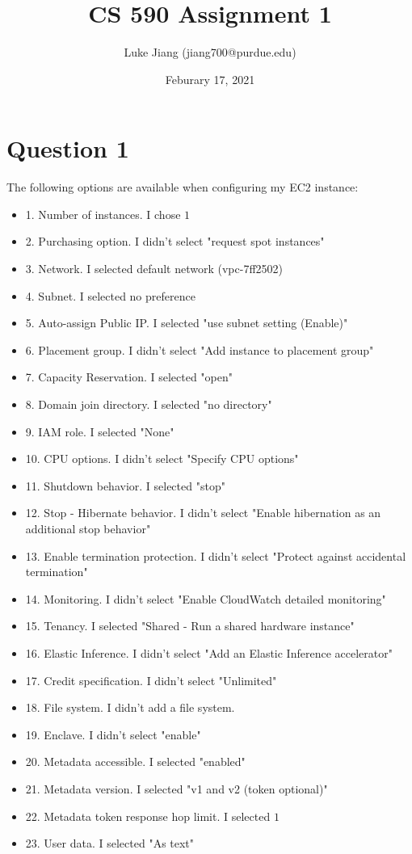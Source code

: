 \documentclass{article}
\title{CS 590 Assignment 1}
\author{Luke Jiang (jiang700@purdue.edu) }
\date{Feburary 17, 2021}
\begin{document}
\maketitle
\section{Question 1}
The following options are available when configuring my EC2 instance:
\begin{itemize}
    \item 1. Number of instances. I chose $1$
    \item 2. Purchasing option. I didn't select "request spot instances"
    \item 3. Network. I selected default network (vpc-7ff2502)
    \item 4. Subnet. I selected no preference
    \item 5. Auto-assign Public IP. I selected "use subnet setting (Enable)"
    \item 6. Placement group. I didn't select "Add instance to placement group"
    \item 7. Capacity Reservation. I selected "open"
    \item 8. Domain join directory. I selected "no directory"
    \item 9. IAM role. I selected "None"
    \item 10. CPU options. I didn't select "Specify CPU options"
    \item 11. Shutdown behavior. I selected "stop"
    \item 12. Stop - Hibernate behavior. I didn't select "Enable hibernation as an additional stop behavior"
    \item 13. Enable termination protection. I didn't select "Protect against accidental termination"
    \item 14. Monitoring. I didn't select "Enable CloudWatch detailed monitoring"
    \item 15. Tenancy. I selected "Shared - Run a shared hardware instance"
    \item 16. Elastic Inference. I didn't select "Add an Elastic Inference accelerator"
    \item 17. Credit specification. I didn't select "Unlimited"
    \item 18. File system. I didn't add a file system.
    \item 19. Enclave. I didn't select "enable"
    \item 20. Metadata accessible. I selected "enabled"
    \item 21. Metadata version. I selected "v1 and v2 (token optional)"
    \item 22. Metadata token response hop limit. I selected $1$
    \item23. User data. I selected "As text"
\end{itemize}
\end{document}
